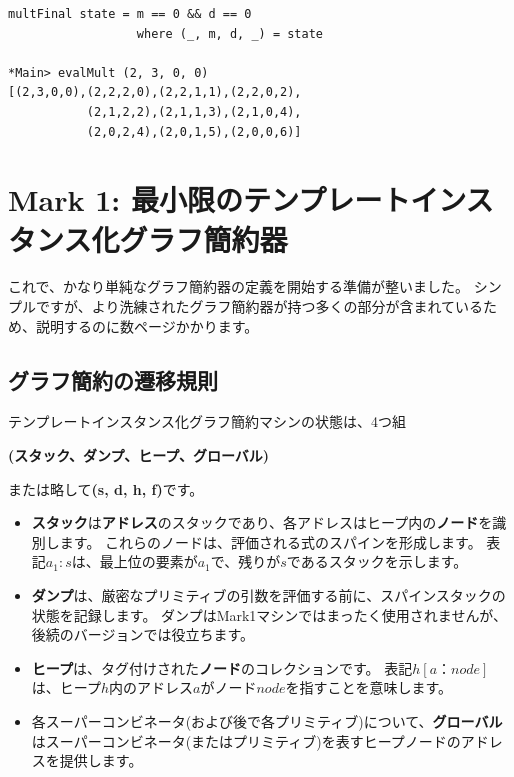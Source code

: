 \documentclass{jbook}
\begin{document}
\begin{verbatim}
multFinal state = m == 0 && d == 0
                  where (_, m, d, _) = state

*Main> evalMult (2, 3, 0, 0)
[(2,3,0,0),(2,2,2,0),(2,2,1,1),(2,2,0,2),
           (2,1,2,2),(2,1,1,3),(2,1,0,4),
           (2,0,2,4),(2,0,1,5),(2,0,0,6)]
\end{verbatim}
\newpage

\section{Mark 1: 最小限のテンプレートインスタンス化グラフ簡約器}

これで、かなり単純なグラフ簡約器の定義を開始する準備が整いました。
シンプルですが、より洗練されたグラフ簡約器が持つ多くの部分が含まれているため、説明するのに数ページかかります。

\subsection{グラフ簡約の遷移規則}

テンプレートインスタンス化グラフ簡約マシンの状態は、4つ組

\begin{center}
	\textbf{(スタック、ダンプ、ヒープ、グローバル)}
\end{center}

または略して\textbf{(s, d, h, f)}です。

\begin{itemize}
	\item \textbf{スタック}は\textbf{アドレス}のスタックであり、各アドレスはヒープ内の\textbf{ノード}を識別します。
	      これらのノードは、評価される式のスパインを形成します。 表記$a_1 : s$は、最上位の要素が$a_1$で、残りが$s$であるスタックを示します。
	\item \textbf{ダンプ}は、厳密なプリミティブの引数を評価する前に、スパインスタックの状態を記録します。
	      ダンプはMark1マシンではまったく使用されませんが、後続のバージョンでは役立ちます。
	\item \textbf{ヒープ}は、タグ付けされた\textbf{ノード}のコレクションです。
	      表記$h [a：node]$は、ヒープ$h$内のアドレス$a$がノード$node$を指すことを意味します。
	\item 各スーパーコンビネータ(および後で各プリミティブ)について、\textbf{グローバル}はスーパーコンビネータ(またはプリミティブ)を表すヒープノードのアドレスを提供します。
\end{itemize}
\end{document}
